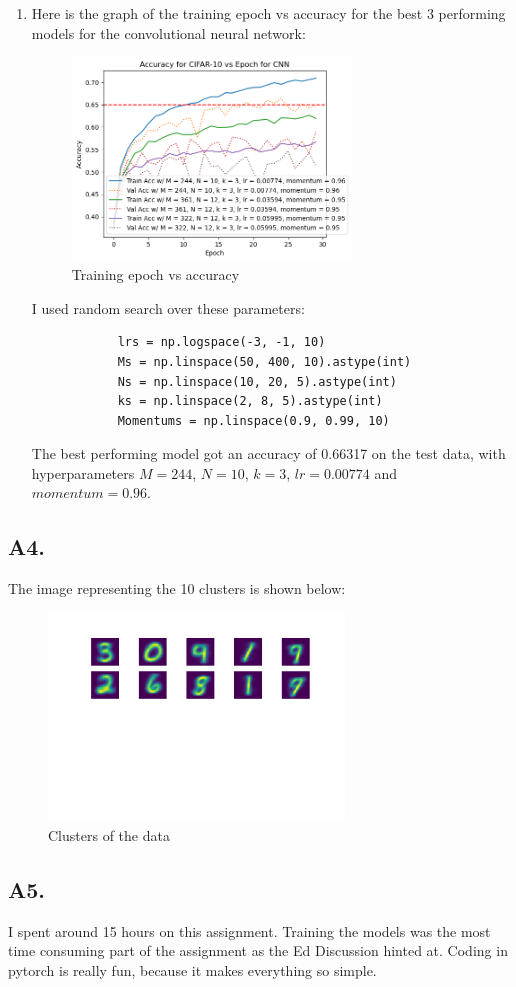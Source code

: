 \documentclass[12pt]{article}
\theoremstyle{definitionstyle}
\begin{document}
\begin{enumerate}[label=\alph*.]
        \item Here is the graph of the training epoch vs accuracy for the best 3 performing models for the convolutional neural network:
        \begin{figure}[H]
            \centering
            \includegraphics[width=0.7\textwidth]{CNN_acc.png}
            \caption{Training epoch vs accuracy}
        \end{figure}
        I used random search over these parameters:
        \begin{verbatim}
            lrs = np.logspace(-3, -1, 10)
            Ms = np.linspace(50, 400, 10).astype(int)
            Ns = np.linspace(10, 20, 5).astype(int)
            ks = np.linspace(2, 8, 5).astype(int)
            Momentums = np.linspace(0.9, 0.99, 10)
        \end{verbatim}
        The best performing model got an accuracy of 0.66317 on the test data, with hyperparameters $M=244$, $N=10$, $k=3$, $lr=0.00774$ and $momentum=0.96$.

        

    \end{enumerate}
    
    \newpage
    \subsection*{A4.}
    The image representing the 10 clusters is shown below:
    \begin{figure}[H]
        \centering
        \includegraphics[width=0.7\textwidth]{clusters.png}
        \caption{Clusters of the data}
    \end{figure}

    \newpage
    \subsection*{A5.}
    I spent around 15 hours on this assignment. Training the models was the most time consuming part of the assignment as the Ed Discussion hinted at. Coding in pytorch is really fun, because it makes everything so simple. 
\end{document}
